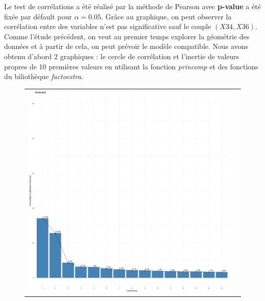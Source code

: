 \documentclass[a4paper,11pt,oneside,roman]{article}
\begin{document}
Le test de corrélations a été réalisé par la méthode de Pearson avec \textbf{p-value} a été fixée par défault pour $\alpha = 0.05$. Grâce au graphique, on peut observer la corrélation entre des variables n'est pas significative sauf le couple $(X34,X36)$. Comme l'étude précédent, on veut au premier temps explorer la géométrie des données et à partir de cela, on peut prévoir le modèle compatible. \newline
Nous avons obtenu d'abord 2 graphiques : le cercle de corrélation et l'inertie de valeurs propres de 10 premières valeurs en utilisant la fonction \textit{princomp} et des fonctions du biliothèque \textit{factoextra}.
\begin{figure}[htb]
    \centering
    \begin{tabular}{c|c}
    \includegraphics[scale = .1]{./discrimination/spambase2/eig_plot.png} &

\end{tabular}
\end{figure}
\end{document}
